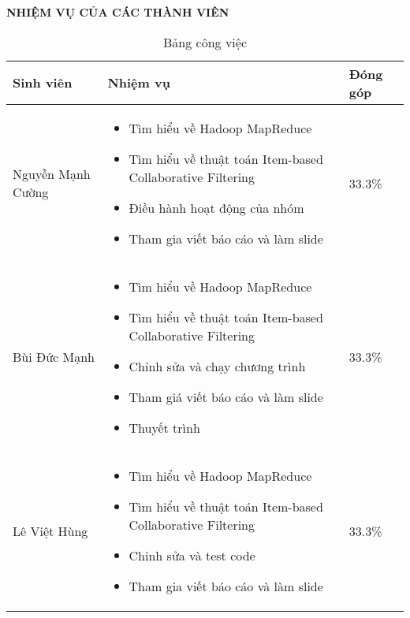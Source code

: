 \vfill
\LARGE \centering \textbf{NHIỆM VỤ CỦA CÁC THÀNH VIÊN}
\vspace{0.5cm}
\begin{table}[h!]
    \centering
    \hspace*{-1.2cm}
    \begin{tabular}{|l|p{10cm}|l|}
        \hline
        \textbf{Sinh viên} & \textbf{Nhiệm vụ}  & \textbf{Đóng góp}                       \\
        \hline
        Nguyễn Mạnh Cường  &
        \begin{itemize}
            \item Tìm hiểu về Hadoop MapReduce
            \item Tìm hiểu về thuật toán Item-based Collaborative Filtering
            \item Điều hành hoạt động của nhóm
            \item Tham gia viết báo cáo và làm slide
        \end{itemize} & 33.3\% \\
        \hline
        Bùi Đức Mạnh       &
        \begin{itemize}
            \item Tìm hiểu về Hadoop MapReduce
            \item Tìm hiểu về thuật toán Item-based Collaborative Filtering
            \item Chỉnh sửa và chạy chương trình
            \item Tham giá viết báo cáo và làm slide
            \item Thuyết trình
        \end{itemize} & 33.3\% \\
        \hline
        Lê Việt Hùng       &
        \begin{itemize}
            \item Tìm hiểu về Hadoop MapReduce
            \item Tìm hiểu về thuật toán Item-based Collaborative Filtering
            \item Chỉnh sửa và test code
            \item Tham gia viết báo cáo và làm slide
        \end{itemize} & 33.3\% \\
        \hline
    \end{tabular}
    \caption{Bảng công việc}
    \label{tab:my_label}
\end{table}
